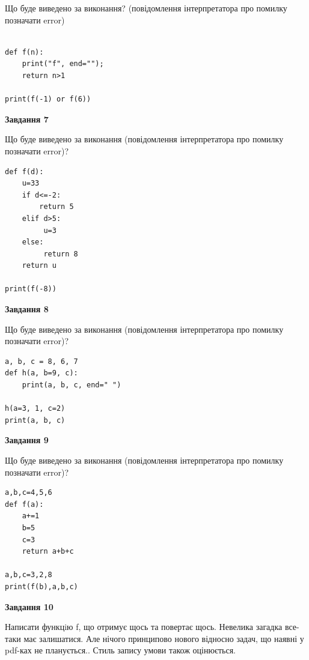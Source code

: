 \documentclass[12pt, ukrainian]{article}
\begin{document}
{\begin {large}
Що буде виведено за виконання? (повідомлення інтерпретатора про помилку позначати error)\par
\begin{verbatim}

def f(n):
    print("f", end="");
    return n>1

print(f(-1) or f(6))
\end{verbatim}

{\begin {center}\textbf{Завдання 7}\end {center}}

Що буде виведено за виконання (повідомлення інтерпретатора про помилку позначати error)?\par
\begin{verbatim}
def f(d):
    u=33
    if d<=-2: 
        return 5
    elif d>5:
         u=3
    else:
         return 8
    return u

print(f(-8))
\end{verbatim}

{\begin {center}\textbf{Завдання 8}\end {center}}

Що буде виведено за виконання (повідомлення інтерпретатора про помилку позначати error)?\par
\begin{verbatim}
a, b, c = 8, 6, 7
def h(a, b=9, c):
    print(a, b, c, end=" ")

h(a=3, 1, c=2)
print(a, b, c)
\end{verbatim}

{\begin {center}\textbf{Завдання 9}\end {center}}

Що буде виведено за виконання (повідомлення інтерпретатора про помилку позначати error)?\par
\begin{verbatim}
a,b,c=4,5,6
def f(a):
    a+=1
    b=5
    c=3
    return a+b+c

a,b,c=3,2,8
print(f(b),a,b,c)
\end{verbatim}

{\begin {center}\textbf{Завдання 10}\end {center}}


Написати функцiю f, що отримує щось та повертає щось. Невелика загадка все-таки має залишатися. Але нічого принципово нового відносно задач, що наявні у pdf-ках не планується.. Стиль запису умови також оцінюється.\par
\end {large}}
\newpage
\end{document}
